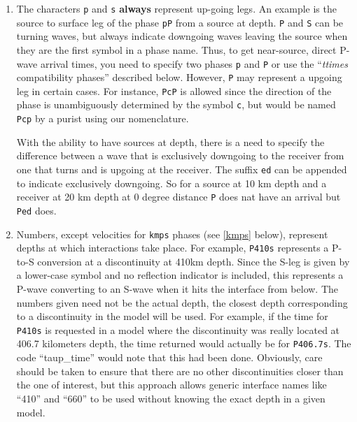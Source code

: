 \begin{enumerate}
\item \label{Ped} The characters \texttt{p} and \texttt{s} \textbf{always} represent
up-going legs.
An example is the source to surface leg of the phase \texttt{pP}
from a source at depth.
\texttt{P} and \texttt{S} can be turning waves, but
always indicate downgoing waves leaving the source when they are the first symbol in a
phase name.
Thus, to get near-source, direct P-wave arrival times, you need to specify two
phases \texttt{p} and \texttt{P} or use the ``\textit{ttimes} compatibility phases'' described
below.
However, \texttt{P} may
represent a upgoing leg in certain cases.
For instance, \texttt{PcP} is
allowed since the direction of the phase is unambiguously determined by the symbol
\texttt{c}, but would be named \texttt{Pcp} by a purist using our nomenclature.

With the ability to have sources at depth, there is a need to specify the difference between a wave that is
exclusively downgoing to the receiver from one that turns and is upgoing at the receiver. The suffix \texttt{ed}
can be appended to indicate exclusively downgoing. So for a source at 10 km depth and a receiver at 20 km depth
at 0 degree distance \texttt{P} does nat have an arrival but \texttt{Ped} does.

\item Numbers, except velocities for \texttt{kmps}
phases (see \ref{kmps} below),
represent depths at which interactions take place.
For example, \texttt{P410s} represents a P-to-S conversion at a discontinuity at 410km
depth.
Since the S-leg is given by a lower-case symbol and no reflection indicator is
included, this represents a P-wave  converting to an S-wave when it hits the interface
from below.
The numbers given need not be the actual depth, the closest depth corresponding to a
discontinuity in the model will be used.
For example, if the time for \texttt{P410s} is requested in a model where the discontinuity
was really located at 406.7 kilometers depth, the time returned would actually be for
\texttt{P406.7s}.
The code ``taup\_time'' would note that this had been done.
Obviously, care should be taken to ensure that there are no other discontinuities
closer than the one of interest, but this approach allows generic interface
names like ``410'' and ``660'' to be used without knowing the exact depth in a given
model.


\end{enumerate}
